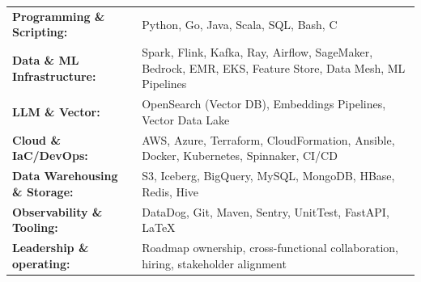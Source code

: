 \begin{flushleft}
\begin{tabular}{@{}l l@{}}
    \textbf{Programming \& Scripting:} & Python, Go, Java, Scala, SQL, Bash, C \\[0.1em]
    \textbf{Data \& ML Infrastructure:} & Spark, Flink, Kafka, Ray, Airflow, SageMaker, Bedrock, EMR, EKS, Feature Store, Data Mesh, ML Pipelines \\[0.1em]
    \textbf{LLM \& Vector:} & OpenSearch (Vector DB), Embeddings Pipelines, Vector Data Lake \\[0.1em]
    \textbf{Cloud \& IaC/DevOps:} & AWS, Azure, Terraform, CloudFormation, Ansible, Docker, Kubernetes, Spinnaker, CI/CD \\[0.1em]
    \textbf{Data Warehousing \& Storage:} & S3, Iceberg, BigQuery, MySQL, MongoDB, HBase, Redis, Hive \\[0.1em]
    \textbf{Observability \& Tooling:} & DataDog, Git, Maven, Sentry, UnitTest, FastAPI, \LaTeX \\[0.1em]
    \textbf{Leadership \& operating:} & Roadmap ownership, cross-functional collaboration, hiring, stakeholder alignment
\end{tabular}
\end{flushleft}
